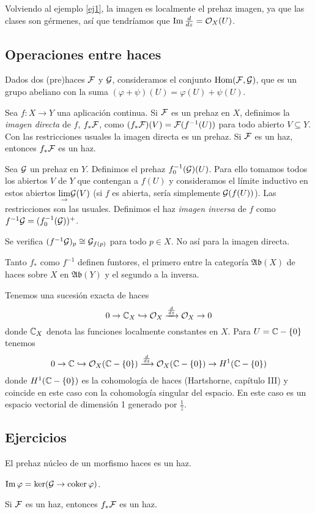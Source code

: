 \documentclass[GA.tex]{subfiles}
\begin{document}
\begin{ej}
Volviendo al ejemplo \ref{ej1}, la imagen es localmente el prehaz imagen, ya que las clases son gérmenes, así que tendríamos que $\operatorname{Im} \frac{d}{dz}={\mathcal O}_X(U)$. 
\end{ej}


\subsection{Operaciones entre haces}
Dados dos (pre)haces $\mathcal{F}$ y $\mathcal{G}$, consideramos el conjunto $\operatorname{Hom}(\mathcal{F},\mathcal{G})$, que es un grupo abeliano con la suma $(\varphi+\psi)(U)=\varphi(U)+\psi(U)$. 

\begin{defi}
Sea $f:X\to Y$ una aplicación continua. Si $\mathcal{F}$ es un prehaz en $X$, definimos la \emph{imagen directa} de $f$, $f_*\mathcal{F}$, como $(f_*\mathcal{F})(V)=\mathcal{F}(f^{-1}(U))$ para todo abierto $V\subseteq Y$. Con las restricciones usuales la imagen directa es un prehaz. Si $\mathcal{F}$ es un haz, entonces $f_*\mathcal{F}$ es un haz. 

Sea $\mathcal{G}$ un prehaz en $Y$. Definimos el prehaz $f^{-1}_0(\mathcal{G})(U)$. Para ello tomamos todos los abiertos $V$ de $Y$ que contengan a $f(U)$ y consideramos el límite inductivo en estos abiertos $\underset{\rightarrow}{\lim}\mathcal{G}(V)$ (si $f$ es abierta, sería simplemente $\mathcal{G}(f(U))$). Las restricciones son las usuales. Definimos el haz \emph{imagen inversa} de $f$ como $f^{-1}\mathcal{G}=(f^{-1}_0(\mathcal{G}))^+$. 
\end{defi}

\begin{prop}
Se verifica $(f^{-1}\mathcal{G})_p\cong \mathcal{G}_{f(p)}$ para todo $p\in X$. No así para la imagen directa.
\end{prop}

Tanto $f_*$ como $f^{-1}$ definen funtores, el primero entre la categoría $\mathfrak{Ab}(X)$ de haces sobre $X$ en $\mathfrak{Ab}(Y)$ y el segundo a la inversa. 


\begin{ej}
Tenemos una sucesión exacta de haces 
\[
0\to \mathbb{C}_X \hookrightarrow {\mathcal O}_X\xrightarrow{\frac{d}{dz}}{\mathcal O}_X\to 0
\]
donde $\mathbb{C}_X$ denota las funciones localmente constantes en $X$. Para $U=\mathbb{C}-\{0\}$ tenemos
\[
0\to \mathbb{C} \hookrightarrow {\mathcal O}_X(\mathbb{C}-\{0\})\xrightarrow{\frac{d}{dz}}{\mathcal O}_X(\mathbb{C}-\{0\})\to H^1(\mathbb{C}-\{0\})
\]
donde $H^1(\mathbb{C}-\{0\})$ es la cohomología de haces (Hartshorne, capítulo III) y coincide en este caso con la cohomología singular del espacio. En este caso es un espacio vectorial de dimensión 1 generado por $\frac{1}{z}$. 
\end{ej}


\subsection{Ejercicios}


\begin{ejer}
El prehaz núcleo de un morfismo haces es un haz.
\end{ejer}

\begin{ejer}
$\operatorname{Im}\varphi=\ker (\mathcal{G}\to \operatorname{coker}\varphi)$. 
\end{ejer}

\begin{ejer}
Si $\mathcal{F}$ es un haz, entonces $f_*\mathcal{F}$ es un haz. 
\end{ejer}
\end{document}
